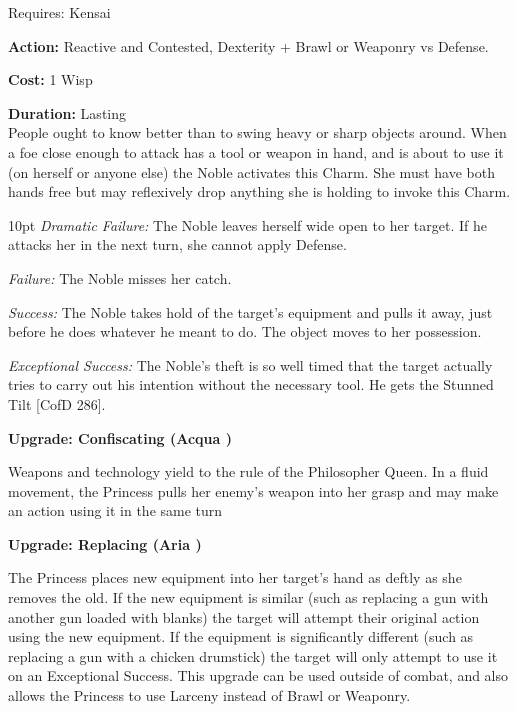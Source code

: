 \noindent Requires: Kensai 

\noindent \textbf{Action:} Reactive and Contested, Dexterity + Brawl or Weaponry vs Defense.

\noindent \textbf{Cost:} 1 Wisp

\noindent \textbf{Duration:} Lasting \\

\noindent People ought to know better than to swing heavy or sharp objects around. When a foe close enough to attack has a tool or weapon in hand, and is about to use it (on herself or anyone else) the Noble activates this Charm. She must have both hands free but may reflexively drop anything she is holding to invoke this Charm.

\begin{myindentpar}{10pt} 
\emph{Dramatic Failure:}  The Noble leaves herself wide open to her target. If he attacks her in the next turn, she cannot apply Defense.

\emph{Failure:} The Noble misses her catch.

\emph{Success:} The Noble takes hold of the target’s equipment and pulls it away, just before he does whatever he meant to do. The object moves to her possession.

\emph{Exceptional Success:}  The Noble’s theft is so well timed that the target actually tries to carry out his intention without the necessary tool. He gets the Stunned Tilt [CofD 286].

\textbf{Upgrade: Confiscating (Acqua \textbullet\textbullet\textbullet)}

Weapons and technology yield to the rule of the Philosopher Queen. In a fluid movement, the Princess pulls her enemy's weapon into her grasp and may make an action using it in the same turn

\textbf{Upgrade: Replacing (Aria \textbullet\textbullet\textbullet)}

The Princess places new equipment into her target's hand as deftly as she removes the old. If the new equipment is similar (such as replacing a gun  with another gun loaded with blanks) the target will attempt their original action using the new equipment. If the equipment is significantly different (such as replacing a gun with a chicken drumstick) the target will only attempt to use it on an Exceptional Success. This upgrade can be used outside of combat, and also allows the Princess to use Larceny instead of Brawl or Weaponry. \end{myindentpar}

